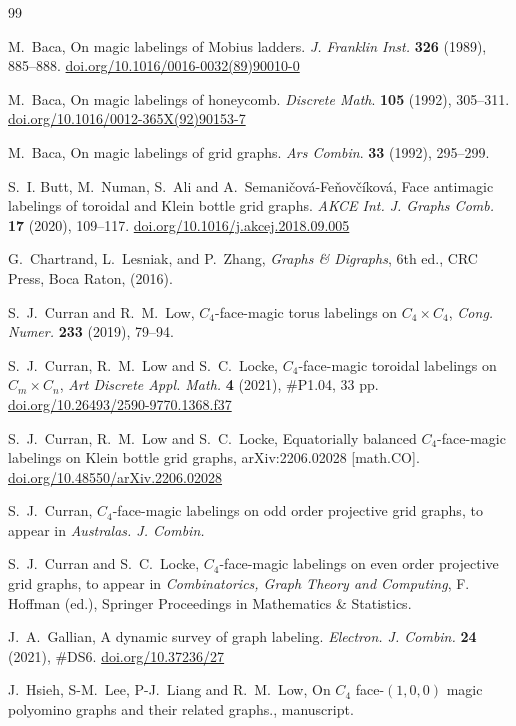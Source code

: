 \documentclass[12pt]{amsart}
\theoremstyle{definition}
\theoremstyle{plain}
\begin{document}
\begin{thebibliography}{99}

M.~Baca, On magic labelings of Mobius ladders. \textit{J. Franklin Inst.} \textbf{326} (1989), 885--888. \url{doi.org/10.1016/0016-0032(89)90010-0}

M.~Baca, On magic labelings of honeycomb. \textit{Discrete Math}. \textbf{105} (1992), 305--311. \url{doi.org/10.1016/0012-365X(92)90153-7}

M.~Baca, On magic labelings of grid graphs. \textit{Ars Combin}. \textbf{33} (1992), 295--299.

S.~I. Butt, M.~Numan, S.~Ali and A.~Semani\v{c}ov\'{a}-Fe\v{n}ov\v{c}\'{i}kov\'{a}, Face antimagic labelings of toroidal and Klein bottle grid graphs.
\textit{AKCE Int. J. Graphs Comb.} \textbf{17} (2020), 109--117. \url{doi.org/10.1016/j.akcej.2018.09.005}

G.~Chartrand, L.~Lesniak, and P.~Zhang, \textit{Graphs \& Digraphs}, 6th ed., CRC Press, Boca Raton, (2016).

S.~J.~Curran and R.~M.~Low, $C_4$-face-magic torus labelings on $C_4 \times C_4$,
\textit{Cong. Numer.} \textbf{233} (2019), 79--94.

S.~J.~Curran, R.~M.~Low and S.~C.~Locke, $C_4$-face-magic toroidal labelings on $C_{m} \times C_{n}$,
\textit{Art Discrete Appl. Math.} \textbf{4} (2021), \#P1.04, 33 pp. \url{doi.org/10.26493/2590-9770.1368.f37}

S.~J.~Curran, R.~M.~Low and S.~C.~Locke, Equatorially balanced $C_4$-face-magic labelings on Klein bottle grid graphs, arXiv:2206.02028 [math.CO].
\url{doi.org/10.48550/arXiv.2206.02028}

S.~J.~Curran, $C_4$-face-magic labelings on odd order projective grid graphs, to appear in \textit{Australas. J. Combin.}

S.~J.~Curran and S.~C.~Locke, $C_4$-face-magic labelings on even order projective grid graphs, to appear in
\textit{Combinatorics, Graph Theory and Computing}, F. Hoffman (ed.),
Springer Proceedings in Mathematics \& Statistics.

J.~A.~Gallian, A dynamic survey of graph labeling.
\textit{Electron. J. Combin.} \textbf{24} (2021), \#DS6. \url{doi.org/10.37236/27}

J.~Hsieh, S-M.~Lee, P-J.~Liang and R.~M.~Low, On $C_4$ face-$(1, 0, 0)$ magic polyomino graphs and their related graphs., manuscript.


\end{thebibliography}
\end{document}
